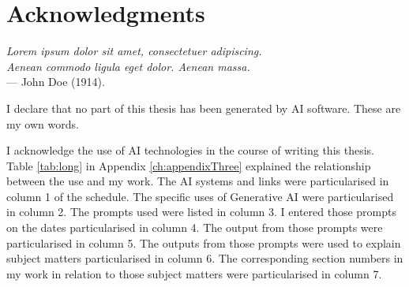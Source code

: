

%
%


\chapter*{Acknowledgments}

\begin{flushright}
{\slshape Lorem ipsum dolor sit amet, consectetuer adipiscing.}\\
{\slshape Aenean commodo ligula eget dolor. Aenean massa.}\\%
\medskip
--- John Doe (1914).%
\end{flushright}

\bigskip

\lipsum[2-5]%

I declare that no part of this thesis has been generated by AI software. These are my own words.

I acknowledge the use of AI technologies in the course of writing this thesis. Table \ref{tab:long} in Appendix \ref{ch:appendixThree} explained the relationship between the use and my work. The AI systems and links were particularised in column 1 of the schedule. The specific uses of Generative AI were particularised in column 2. The prompts used were listed in column 3. I entered those prompts on the dates particularised in column 4. The output from those prompts were particularised in column 5. The outputs from those prompts were used to explain subject matters particularised in column 6. The corresponding section numbers in my work in relation to those subject matters were particularised in column 7.




